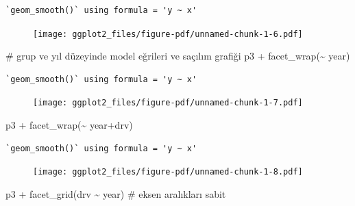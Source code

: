 \documentclass[
  letterpaper,
  DIV=11,
  numbers=noendperiod]{scrreprt}
\newenvironment{Shaded}{\begin{snugshade}}{\end{snugshade}}
\newcommand{\CommentTok}[1]{\textcolor[rgb]{0.37,0.37,0.37}{#1}}
\newcommand{\FunctionTok}[1]{\textcolor[rgb]{0.28,0.35,0.67}{#1}}
\newcommand{\NormalTok}[1]{\textcolor[rgb]{0.00,0.23,0.31}{#1}}
\newcommand{\SpecialCharTok}[1]{\textcolor[rgb]{0.37,0.37,0.37}{#1}}
\begin{document}
\begin{verbatim}
`geom_smooth()` using formula = 'y ~ x'
\end{verbatim}

\begin{figure}[H]

{\centering \texttt{[image: ggplot2\_files/figure-pdf/unnamed-chunk-1-6.pdf]}

}

\end{figure}

\begin{Shaded}
\begin{Highlighting}[]
\CommentTok{\# grup ve yıl düzeyinde model eğrileri ve saçılım grafiği}
\NormalTok{p3 }\SpecialCharTok{+} \FunctionTok{facet\_wrap}\NormalTok{(}\SpecialCharTok{\textasciitilde{}}\NormalTok{ year)}
\end{Highlighting}
\end{Shaded}

\begin{verbatim}
`geom_smooth()` using formula = 'y ~ x'
\end{verbatim}

\begin{figure}[H]

{\centering \texttt{[image: ggplot2\_files/figure-pdf/unnamed-chunk-1-7.pdf]}

}

\end{figure}

\begin{Shaded}
\begin{Highlighting}[]
\NormalTok{p3 }\SpecialCharTok{+} \FunctionTok{facet\_wrap}\NormalTok{(}\SpecialCharTok{\textasciitilde{}}\NormalTok{ year}\SpecialCharTok{+}\NormalTok{drv)}
\end{Highlighting}
\end{Shaded}

\begin{verbatim}
`geom_smooth()` using formula = 'y ~ x'
\end{verbatim}

\begin{figure}[H]

{\centering \texttt{[image: ggplot2\_files/figure-pdf/unnamed-chunk-1-8.pdf]}

}

\end{figure}

\begin{Shaded}
\begin{Highlighting}[]
\NormalTok{p3 }\SpecialCharTok{+} \FunctionTok{facet\_grid}\NormalTok{(drv }\SpecialCharTok{\textasciitilde{}}\NormalTok{ year) }\CommentTok{\# eksen aralıkları sabit}
\end{Highlighting}
\end{Shaded}
\end{document}
